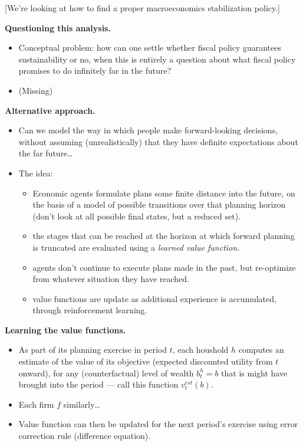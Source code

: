 [We're looking at how to find a proper
macroeconomics stabilization policy.]

\medskip\noindent
{\bf Questioning this analysis.}
\begin{itemize}
\item Conceptual problem: how can one settle
whether fiscal policy guarantees
sustainability or no, when this is entirely
a question about what fiscal policy promises
to do infinitely far in the future?

\item (Missing)
\end{itemize}

\medskip\noindent
{\bf Alternative approach.}

\begin{itemize}
\item Can we model the way in which people
make forward-looking decisions, without
assuming (unrealistically) that they have
definite expectations about the far
future…

\item  The idea: 
\begin{itemize}
\item Economic agents formulate plans some
finite distance into the future, on the
basis of a model of possible transitions
over that planning horizon (don't look at
all possible final states, but a reduced
set).

\item the stages that can be reached at the
horizon at which forward planning is
truncated are evaluated using a {\it learned
value function}.
\item agents don't continue to execute plans
made in the past, but re-optimize from
whatever situation they have reached.
\item value functions are update as
additional experience is accumulated,
through reinforcement learning.
\end{itemize}
\end{itemize}

\medskip\noindent
{\bf Learning the value functions.}
\begin{itemize}
\item As part of its planning exercise in
period $t$, each houshold $h$ computes an
estimate of the value of its objective
(expected discounted utility from $t$
onward), for any (counterfactual) level of
wealth $b_t^h = b$ that is might have
brought into the period --- call this
function $v^{est}_t(b)$.

\item Each firm $f$ similarly…
\item Value function can then be updated for
the next period's exercise using error
correction rule (difference equation).
\end{itemize}


